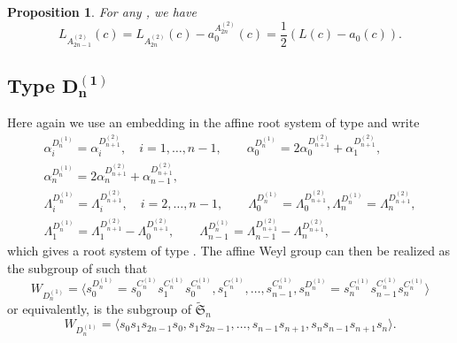 \documentclass[10pt,a4paper]{amsart}
\newtheorem{Proposition}[Theorem]{Proposition}
 { \theoremstyle{definition}
\newtheorem{Definition}[Theorem]{Definition}
\newtheorem{Note}[Theorem]{Note}
\newtheorem{Example}[Theorem]{Example}
\newtheorem{Remark}[Theorem]{Remark} }
\numberwithin{equation}{section}
\begin{document}
\begin{Proposition}
	\label{Prop_A(2n-1,2)} For any , we have
	\begin{equation*}
	L_{A_{2n-1}^{(2)}}(c)=L_{A_{2n}^{(2)}}(c)-a_{0}^{A_{2n}^{(2)}}(c)=\frac{1}{2}
	(L(c)-a_{0}(c)).
	\end{equation*}
\end{Proposition}

\subsection[Type D\_n\^{}(1)]{Type $\boldsymbol{D_{n}^{(1)}}$}

Here again we use an embedding in the affine root system of type  and write
\begin{gather}
\alpha _{i}^{D_{n}^{(1)}}=\alpha _{i}^{D_{n+1}^{(2)}},\quad i=1,\dots ,n-1, \qquad
\alpha _{0}^{D_{n}^{(1)}}=2\alpha _{0}^{D_{n+1}^{(2)}}+\alpha
_{1}^{D_{n+1}^{(2)}} ,\nonumber\\
\alpha _{n}^{D_{n}^{(1)}}=2\alpha _{n}^{D_{n+1}^{(2)}}+\alpha
_{n-1}^{D_{n+1}^{(2)}},\nonumber\\
\Lambda _{i}^{D_{n}^{(1)}}=\Lambda _{i}^{D_{n+1}^{(2)}},\quad i=2,\dots ,n-1, \qquad
\Lambda _{0}^{D_{n}^{(1)}}=\Lambda _{0}^{D_{n+1}^{(2)}},\Lambda
_{n}^{D_{n}^{(1)}}=\Lambda _{n}^{D_{n+1}^{(2)}} ,\nonumber\\
\Lambda _{1}^{D_{n}^{(1)}}=\Lambda _{1}^{D_{n+1}^{(2)}}-\Lambda
_{0}^{D_{n+1}^{(2)}},\qquad \Lambda _{n-1}^{D_{n}^{(1)}}=\Lambda
_{n-1}^{D_{n+1}^{(2)}}-\Lambda _{n}^{D_{n+1}^{(2)}},
 \label{RelDA}
\end{gather}
which gives a root system of type . The affine Weyl group  can then be realized as the subgroup of
 such that
\begin{equation*}
W_{D_{n}^{(1)}}=\bigl\langle
s_{0}^{D_{n}^{(1)}}=s_{0}^{C_{n}^{(1)}}s_{1}^{C_{n}^{(1)}}s_{0}^{C_{n}^{(1)}},s_{1}^{C_{n}^{(1)}},\dots ,s_{n-1}^{C_{n}^{(1)}},s_{n}^{D_{n}^{(1)}}=s_{n}^{C_{n}^{(1)}}s_{n-1}^{C_{n}^{(1)}}s_{n}^{C_{n}^{(1)}}\bigr\rangle
\end{equation*}%
or equivalently,  is the subgroup of $\widetilde{\mathfrak{S%
}}_{n}$%
\begin{equation*}
W_{D_{n}^{(1)}}=\langle s_{0}s_{1}s_{2n-1}s_{0},s_{1}s_{2n-1},\dots
,s_{n-1}s_{n+1},s_{n}s_{n-1}s_{n+1}s_{n}\rangle .
\end{equation*}%
\end{document}
